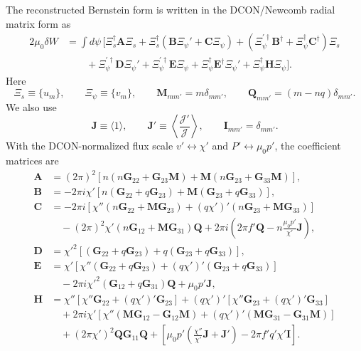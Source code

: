 \documentclass[10pt,a4paper]{article}
\numberwithin{equation}{section}
\begin{document}
The reconstructed Bernstein form is written in the DCON/Newcomb radial matrix
form as
\begin{equation}
\boxed{
\begin{aligned}
2\mu_0\delta W
&=
\int d\psi\,
\Big[
\Xi_s^\dagger \mathbf A \Xi_s
+\Xi_s^\dagger(\mathbf B\Xi_\psi' + \mathbf C\Xi_\psi)
+(\Xi_\psi^{\prime\dagger}\mathbf B^\dagger+\Xi_\psi^\dagger\mathbf C^\dagger)\Xi_s \\
&\qquad
+\Xi_\psi^{\prime\dagger}\mathbf D\Xi_\psi'
+\Xi_\psi^{\prime\dagger}\mathbf E\Xi_\psi
+\Xi_\psi^\dagger\mathbf E^\dagger\Xi_\psi'
+\Xi_\psi^\dagger\mathbf H\Xi_\psi
\Big].
\end{aligned}
}
\end{equation}
Here
\begin{equation}
\Xi_s\equiv\{u_m\},
\qquad
\Xi_\psi\equiv\{v_m\},
\qquad
\mathbf M_{mm'}=m\delta_{mm'},
\qquad
\mathbf Q_{mm'}=(m-nq)\delta_{mm'}.
\end{equation}
We also use
\begin{equation}
\mathbf J\equiv\langle 1\rangle,
\qquad
\mathbf J'\equiv\left\langle \frac{\mathcal J'}{\mathcal J}\right\rangle,
\qquad
\mathbf I_{mm'}=\delta_{mm'}.
\end{equation}
With the DCON-normalized flux scale $v'\leftrightarrow\chi'$ and $P'\leftrightarrow\mu_0p'$, the coefficient matrices are
\begin{equation}
\boxed{
\begin{aligned}
\mathbf A
&=(2\pi)^2
\left[
n(n\mathbf G_{22}+\mathbf G_{23}\mathbf M)
+\mathbf M(n\mathbf G_{23}+\mathbf G_{33}\mathbf M)
\right],\\
\mathbf B
&=-2\pi i\chi'
\left[
n(\mathbf G_{22}+q\mathbf G_{23})
+\mathbf M(\mathbf G_{23}+q\mathbf G_{33})
\right],\\
\mathbf C
&=-2\pi i
\left[
\chi''(n\mathbf G_{22}+\mathbf M\mathbf G_{23})
+(q\chi')'(n\mathbf G_{23}+\mathbf M\mathbf G_{33})
\right] \\
&\quad
-(2\pi)^2\chi'(n\mathbf G_{12}+\mathbf M\mathbf G_{31})\mathbf Q
+2\pi i
\left(
2\pi f'\mathbf Q
-n\frac{\mu_0p'}{\chi'}\mathbf J
\right),\\
\mathbf D
&=\chi'^2
\left[
(\mathbf G_{22}+q\mathbf G_{23})
+q(\mathbf G_{23}+q\mathbf G_{33})
\right],\\
\mathbf E
&=\chi'
\left[
\chi''(\mathbf G_{22}+q\mathbf G_{23})
+(q\chi')'(\mathbf G_{23}+q\mathbf G_{33})
\right] \\
&\quad
-2\pi i\chi'^2(\mathbf G_{12}+q\mathbf G_{31})\mathbf Q
+\mu_0p'\mathbf J,\\
\mathbf H
&=
\chi''
\left[
\chi''\mathbf G_{22}+(q\chi')'\mathbf G_{23}
\right]
+(q\chi')'
\left[
\chi''\mathbf G_{23}+(q\chi')'\mathbf G_{33}
\right] \\
&\quad
+2\pi i\chi'
\left[
\chi''(\mathbf M\mathbf G_{12}-\mathbf G_{12}\mathbf M)
+(q\chi')'(\mathbf M\mathbf G_{31}-\mathbf G_{31}\mathbf M)
\right] \\
&\quad
+(2\pi\chi')^2\mathbf Q\mathbf G_{11}\mathbf Q
+\left[
\mu_0p'\left(\frac{\chi''}{\chi'}\mathbf J+\mathbf J'\right)
-2\pi f'q'\chi'\mathbf I
\right].
\end{aligned}
}
\end{equation}
\end{document}
